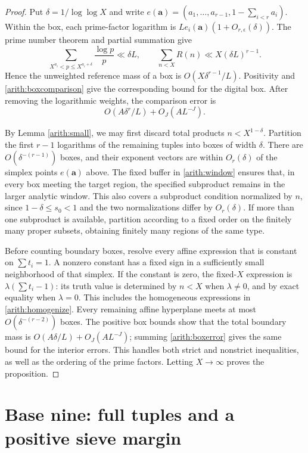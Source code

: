 \documentclass[11pt,a4paper]{article}
\theoremstyle{paperplain}
\numberwithin{equation}{section}
\begin{document}
\begin{proof}
Put $\delta=1/\log\log X$ and write
$e(\boldsymbol a)=(a_1,\ldots,a_{r-1},1-\sum_{i<r}a_i)$.
Within the box, each prime-factor logarithm is
$L e_i(\boldsymbol a)(1+O_{r,\epsilon}(\delta))$.
The prime number theorem and partial summation give
\[
 \sum_{X^{a_i}<p\le X^{a_i+\delta}}\frac{\log p}{p}
       \ll\delta L,
 \qquad \sum_{n<X}R(n)\ll X(\delta L)^{r-1}.
\]
Hence the unweighted reference mass of a box is
$O(X\delta^{r-1}/L)$.
Positivity and \eqref{arith:boxcomparison} give the corresponding
bound for the digital box. After removing the logarithmic weights,
the comparison error is
\begin{equation}\label{arith:boxerror}
 O(A\delta^r/L)+O_J(AL^{-J}).
\end{equation}

By Lemma \ref{arith:small}, we may first discard total products
$n<X^{1-\delta}$. Partition the first $r-1$ logarithms of the remaining
tuples into boxes of width $\delta$.
There are $O(\delta^{-(r-1)})$ boxes, and their exponent vectors are
within $O_r(\delta)$ of the simplex points $e(\boldsymbol a)$ above.
The fixed buffer in \eqref{arith:window} ensures that, in every box
meeting the target region, the specified subproduct remains in the
larger analytic window. This also covers a subproduct condition
normalized by $n$, since $1-\delta\le s_0<1$ and the two
normalizations differ by $O_r(\delta)$.
If more than one subproduct is available, partition according to a
fixed order on the finitely many proper subsets, obtaining finitely
many regions of the same type.

Before counting boundary boxes, resolve every affine expression
that is constant on $\sum t_i=1$.
A nonzero constant has a fixed sign in a sufficiently small
neighborhood of that simplex. If the constant is zero, the
fixed-$X$ expression is $\lambda(\sum t_i-1)$: its truth value is
determined by $n<X$ when $\lambda\ne0$, and by exact equality when
$\lambda=0$. This includes the homogeneous expressions in
\eqref{arith:homogenize}.
Every remaining affine hyperplane meets at most
$O(\delta^{-(r-2)})$ boxes.
The positive box bounds show that the total boundary mass is
$O(A\delta/L)+O_J(AL^{-J})$; summing \eqref{arith:boxerror} gives the
same bound for the interior errors.
This handles both strict and nonstrict inequalities, as well as the
ordering of the prime factors.
Letting $X\to\infty$ proves the proposition.
\end{proof}

\section{Base nine: full tuples and a positive sieve margin}\label{nine:sieve-section}
\end{document}
